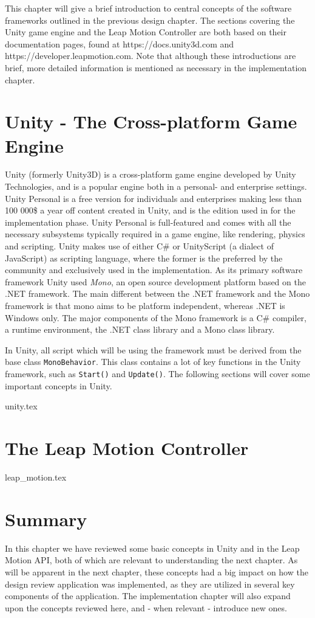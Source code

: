 This chapter will give a brief introduction to central concepts of the software frameworks outlined in the previous design chapter.
The sections covering the Unity game engine and the Leap Motion Controller are both based on their documentation pages, found at 
https://docs.unity3d.com and https://developer.leapmotion.com.
Note that although these introductions are brief, more detailed information is mentioned as necessary in the implementation chapter.

\section{Unity - The Cross-platform Game Engine}
Unity (formerly Unity3D) is a cross-platform game engine developed by Unity Technologies, and is a popular engine both in a personal- and enterprise settings.
Unity Personal is a free version for individuals and enterprises making less than 100 000\$ a year off content created in Unity, and is the 
edition used in for the implementation phase.
Unity Personal is full-featured and comes with all the necessary subsystems typically required in a game engine, like rendering, physics and scripting.
Unity makes use of either C\# or UnityScript (a dialect of JavaScript) as scripting language, where the former is the preferred by the community and 
exclusively used in the implementation. As its primary software framework Unity used \textit{Mono}, an open source development platform based on the .NET
framework. The main different between the .NET framework and the Mono framework is that mono aims to be platform independent, whereas .NET is Windows only.
The major components of the Mono framework is a C\# compiler, a runtime environment, the .NET class library and a Mono class library.

In Unity, all script which will be using the framework must be derived from the base class \texttt{MonoBehavior}. 
This class contains a lot of key functions in the Unity framework, such as \texttt{Start()} and \texttt{Update()}. 
The following sections will cover some important concepts in Unity.

{unity.tex}

\section{The Leap Motion Controller}
{leap_motion.tex}

\section{Summary}
In this chapter we have reviewed some basic concepts in Unity and in the Leap Motion API, both of which are relevant to understanding the next chapter. 
As will be apparent in the next chapter, these concepts had a big impact on how the design review application was implemented, as 
they are utilized in several key components of the application.
The implementation chapter will also expand upon the concepts reviewed here, and - when relevant - introduce new ones.

